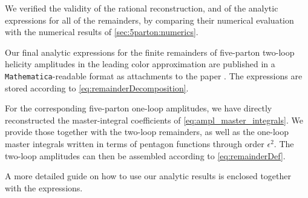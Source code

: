 
We verified the validity of the rational reconstruction, and of the 
analytic expressions for all of the remainders, 
by comparing their numerical evaluation with  the numerical results of \cref{sec:5parton:numerics}.

Our final analytic expressions for the finite remainders of five-parton two-loop helicity amplitudes in the leading color approximation
are published in a \texttt{Mathematica}-readable format as attachments to the paper \cite{Abreu:2019odu}.
The expressions are stored according to \cref{eq:remainderDecomposition}.

For the corresponding five-parton one-loop amplitudes, 
we have directly reconstructed the master-integral coefficients of \cref{eq:ampl_master_integrals}.
We provide those together with the two-loop remainders, 
as well as the one-loop master integrals written in terms of pentagon functions through order $\epsilon^2$.
The two-loop amplitudes can then be assembled according to \cref{eq:remainderDef}.

A more detailed guide on how to use our analytic results is enclosed together with the expressions.



